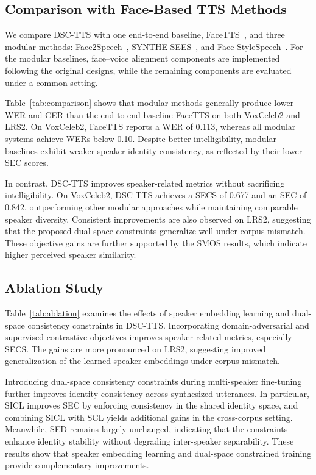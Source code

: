 \documentclass[cameraready]{Interspeech}
\begin{document}
\subsection{Comparison with Face-Based TTS Methods}

We compare DSC-TTS with one end-to-end baseline, FaceTTS~\cite{10094745}, and three modular methods: Face2Speech~\cite{goto20_interspeech}, SYNTHE-SEES~\cite{9746808}, and Face-StyleSpeech~\cite{10889667}. For the modular baselines, face--voice alignment components are implemented following the original designs, while the remaining components are evaluated under a common setting.

Table~\ref{tab:comparison} shows that modular methods generally produce lower WER and CER than the end-to-end baseline FaceTTS on both VoxCeleb2 and LRS2. On VoxCeleb2, FaceTTS reports a WER of 0.113, whereas all modular systems achieve WERs below 0.10. Despite better intelligibility, modular baselines exhibit weaker speaker identity consistency, as reflected by their lower SEC scores.

In contrast, DSC-TTS improves speaker-related metrics without sacrificing intelligibility. On VoxCeleb2, DSC-TTS achieves a SECS of 0.677 and an SEC of 0.842, outperforming other modular approaches while maintaining comparable speaker diversity. Consistent improvements are also observed on LRS2, suggesting that the proposed dual-space constraints generalize well under corpus mismatch. These objective gains are further supported by the SMOS results, which indicate higher perceived speaker similarity.

\subsection{Ablation Study}

Table~\ref{tab:ablation} examines the effects of speaker embedding learning and dual-space consistency constraints in DSC-TTS. Incorporating domain-adversarial and supervised contrastive objectives improves speaker-related metrics, especially SECS. The gains are more pronounced on LRS2, suggesting improved generalization of the learned speaker embeddings under corpus mismatch.

Introducing dual-space consistency constraints during multi-speaker fine-tuning further improves identity consistency across synthesized utterances. In particular, SICL improves SEC by enforcing consistency in the shared identity space, and combining SICL with SCL yields additional gains in the cross-corpus setting. Meanwhile, SED remains largely unchanged, indicating that the constraints enhance identity stability without degrading inter-speaker separability. These results show that speaker embedding learning and dual-space constrained training provide complementary improvements.
\end{document}
